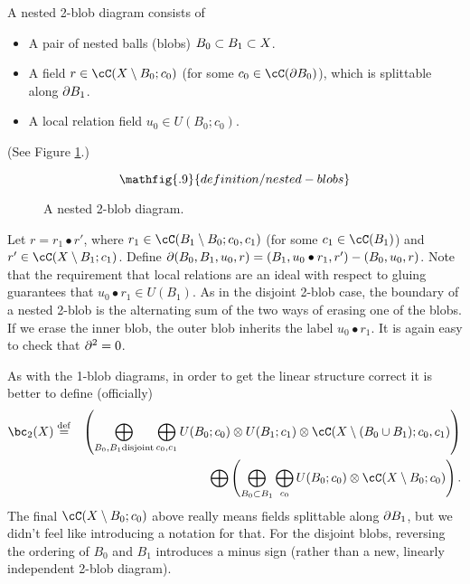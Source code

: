 A nested 2-blob diagram consists of
\begin{itemize}
\item A pair of nested balls (blobs) $B_0 \subset B_1 \subset X$.
\item A field $r \in \cC(X \setmin B_0; c_0)$
(for some $c_0 \in \cC(\bd B_0)$), which is splittable along $\partial B_1$.
\item A local relation field $u_0 \in U(B_0; c_0)$.
\end{itemize}
(See Figure \ref{blob2ndiagram}.)
\begin{figure}[t]\begin{equation*}
\mathfig{.9}{definition/nested-blobs}
\end{equation*}\caption{A nested 2-blob diagram.}\label{blob2ndiagram}\end{figure}
Let $r = r_1 \bullet r'$, where $r_1 \in \cC(B_1 \setmin B_0; c_0, c_1)$
(for some $c_1 \in \cC(B_1)$) and
$r' \in \cC(X \setmin B_1; c_1)$.
Define $\partial(B_0, B_1, u_0, r) = (B_1, u_0\bullet r_1, r') - (B_0, u_0, r)$.
Note that the requirement that
local relations are an ideal with respect to gluing guarantees that $u_0\bullet r_1 \in U(B_1)$.
As in the disjoint 2-blob case, the boundary of a nested 2-blob is the alternating
sum of the two ways of erasing one of the blobs.
If we erase the inner blob, the outer blob inherits the label $u_0\bullet r_1$.
It is again easy to check that $\partial^2 = 0$.

As with the 1-blob diagrams, in order to get the linear structure correct it is better to define
(officially)
\begin{eqnarray*}
	\bc_2(X) & \deq &
	\left( 
		\bigoplus_{B_0, B_1 \text{disjoint}} \bigoplus_{c_0, c_1}
			U(B_0; c_0) \otimes U(B_1; c_1) \otimes \lf(X\setmin (B_0\cup B_1); c_0, c_1)
	\right) \\
	&& \bigoplus \left( 
		\bigoplus_{B_0 \subset B_1} \bigoplus_{c_0}
			U(B_0; c_0) \otimes \lf(X\setmin B_0; c_0)
	\right) .
\end{eqnarray*}
The final $\lf(X\setmin B_0; c_0)$ above really means fields splittable along $\partial B_1$,
but we didn't feel like introducing a notation for that.
For the disjoint blobs, reversing the ordering of $B_0$ and $B_1$ introduces a minus sign
(rather than a new, linearly independent 2-blob diagram).


